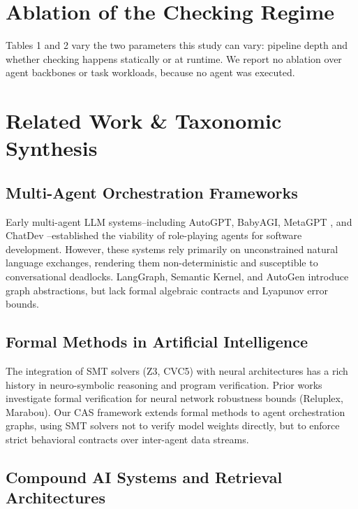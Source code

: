 \documentclass[10pt,journal,compsoc,twocolumn]{IEEEtran}
\begin{document}
\section{Ablation of the Checking Regime}


Tables 1 and 2 vary the two parameters this study can vary: pipeline depth and whether checking happens statically or at runtime. We report no ablation over agent backbones or task workloads, because no agent was executed.




\section{Related Work \& Taxonomic Synthesis}



\subsection{Multi-Agent Orchestration Frameworks}

Early multi-agent LLM systems--including AutoGPT, BabyAGI, MetaGPT \cite{crossref_10_48550_arxiv_2308_00352}, and ChatDev \cite{crossref_10_18653_v1_2024_acl_long_810}--established the viability of role-playing agents for software development. However, these systems rely primarily on unconstrained natural language exchanges, rendering them non-deterministic and susceptible to conversational deadlocks. LangGraph, Semantic Kernel, and AutoGen introduce graph abstractions, but lack formal algebraic contracts and Lyapunov error bounds.


\subsection{Formal Methods in Artificial Intelligence}

The integration of SMT solvers (Z3, CVC5) with neural architectures has a rich history in neuro-symbolic reasoning and program verification. Prior works investigate formal verification for neural network robustness bounds (Reluplex, Marabou). Our CAS framework extends formal methods to agent orchestration graphs, using SMT solvers not to verify model weights directly, but to enforce strict behavioral contracts over inter-agent data streams.


\subsection{Compound AI Systems and Retrieval Architectures}
\end{document}
